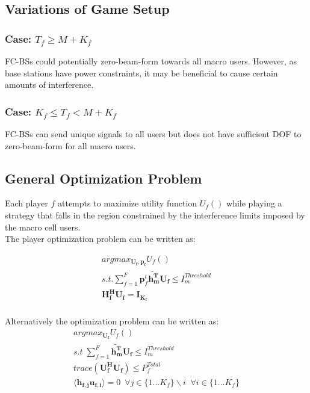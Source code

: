 \documentclass[12pt]{article}
\begin{document}
\subsection{Variations of Game Setup}

\subsubsection{Case: $T_f \geq M + K_f$}
FC-BSs could potentially zero-beam-form towards all macro users. However, as base stations have power constraints, it may be beneficial to cause certain amounts of interference. 

\subsubsection{Case: $K_f \leq T_f < M + K_f$}
FC-BSs can send unique signals to all users but does not have sufficient DOF to zero-beam-form for all macro users.


\subsection{General Optimization Problem}

Each player $f$ attempts to maximize utility function $U_f()$ while playing a strategy that falls in the region constrained by the interference limits imposed by the macro cell users.
\\

The player optimization problem can be written as:

\begin{gather*} 
argmax_{\mathbf{U_f,\mathbf{p}_f}} U_f() 
\\
s.t. \sum^F_{f=1} \mathbf{p}_f^t \mathbf{\tilde{h_m^T}}  \mathbf{U_f}  \leq I^{Threshold}_{m} 
\\
\mathbf{H_f^H}\mathbf{U_f} = \mathbf{I_{K_f}}
\end{gather*}
\\

Alternatively the optimization problem can be written as:
\\

\begin{gather} 
argmax_{\mathbf{U_f}} U_f()\label{utility}
\\
s.t \; \sum^F_{f=1} \mathbf{\tilde{h_m^T}}  \mathbf{U_f}  \leq I^{Threshold}_{m} \label{interference_contstraint}
\\
trace(\mathbf{U_f^H}\mathbf{U_f}) \leq P^{Total}_{f} \label{power_constraint}
\\
\langle \mathbf{h_{f,j}}\mathbf{u_{f,i}} \rangle =0\ \; \forall j \in \{1 ... K_f\}\backslash i \;\; \forall i \in \{1 ... K_f\} \label{Zero_Forcing}
\end{gather}
\\
\end{document}
